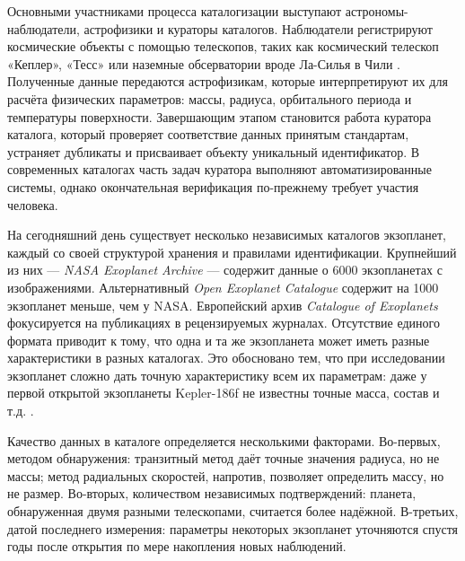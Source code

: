 \documentclass[14pt,a4paper]{extarticle}
\begin{document}
	Основными участниками процесса каталогизации выступают астрономы-наблюдатели, астрофизики и кураторы каталогов. Наблюдатели регистрируют космические объекты с помощью телескопов, таких как космический телескоп «Кеплер», «Тесс» или наземные обсерватории вроде Ла-Силья в Чили \cite{lasilla}. Полученные данные передаются астрофизикам, которые интерпретируют их для расчёта физических параметров: массы, радиуса, орбитального периода и температуры поверхности. Завершающим этапом становится работа куратора каталога, который проверяет соответствие данных принятым стандартам, устраняет дубликаты и присваивает объекту уникальный идентификатор. В современных каталогах часть задач куратора выполняют автоматизированные системы, однако окончательная верификация по-прежнему требует участия человека.
	
	На сегодняшний день существует несколько независимых каталогов экзопланет, каждый со своей структурой хранения и правилами идентификации. Крупнейший из них --- \textit{NASA Exoplanet Archive} \cite{nasa-exoplanet-catalog} --- содержит данные о 6000 экзопланетах с изображениями. Альтернативный \textit{Open Exoplanet Catalogue} \cite{oec} содержит на 1000 экзопланет меньше, чем у NASA. Европейский архив \textit{Catalogue of Exoplanets} фокусируется на публикациях в рецензируемых журналах. Отсутствие единого формата приводит к тому, что одна и та же экзопланета может иметь разные характеристики в разных каталогах. Это обосновано тем, что при исследовании экзопланет сложно дать точную характеристику всем их параметрам: даже у первой открытой экзопланеты Kepler-186f не известны точные масса, состав и т.д. \cite{kepler}.
	
	Качество данных в каталоге определяется несколькими факторами. Во-первых, методом обнаружения: транзитный метод даёт точные значения радиуса, но не массы; метод радиальных скоростей, напротив, позволяет определить массу, но не размер. Во-вторых, количеством независимых подтверждений: планета, обнаруженная двумя разными телескопами, считается более надёжной. В-третьих, датой последнего измерения: параметры некоторых экзопланет уточняются спустя годы после открытия по мере накопления новых наблюдений.
	
\end{document}
